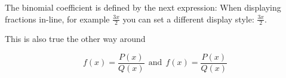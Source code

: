 \documentclass{article}
\begin{document}
The binomial coefficient is defined by the next expression:
When displaying fractions in-line, for example \(\frac{3x}{2}\) 
you can set a different display style: 
\( \displaystyle \frac{3x}{2} \).

This is also true the other way around

\[ f(x)=\frac{P(x)}{Q(x)} \ \ \textrm{and} 
\ \ f(x)=\textstyle\frac{P(x)}{Q(x)} \]
\end{document}
